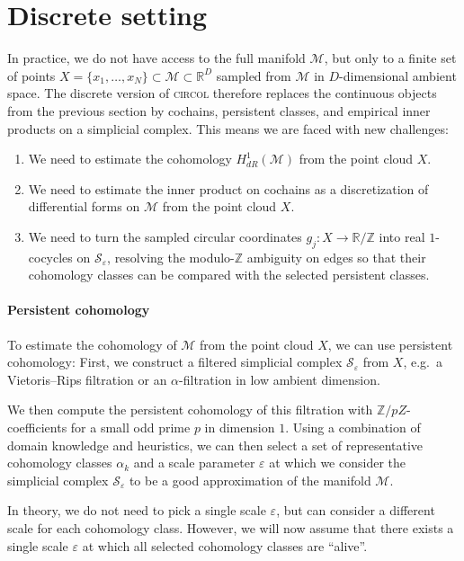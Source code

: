 \documentclass[a4paper,11pt, DIV=10]{scrartcl}
\numberwithin{equation}{section}
\theoremstyle{definition}
\theoremstyle{remark}
\newcommand{\Z}{\mathbb{Z}}
\newcommand{\R}{\mathbb{R}}
\newcommand{\mc}[1]{\mathcal{#1}}
\begin{document}
\section{Discrete setting}
\label{sec:discrete-setting}
In practice, we do not have access to the full manifold $\mc{M}$, but only to a finite set of points $X=\{x_1,\dots, x_N\}\subset \mc{M}\subset \R^D$ sampled from $\mc{M}$ in $D$-dimensional ambient space.
The discrete version of \textsc{circol} therefore replaces the continuous objects from the previous section by cochains, persistent classes, and empirical inner products on a simplicial complex.
This means we are faced with new challenges:
\begin{enumerate}
	\item We need to estimate the cohomology $H^1_{dR}(\mc{M})$ from the point cloud $X$.
	\item We need to estimate the inner product on cochains as a discretization of differential forms on $\mc{M}$ from the point cloud $X$.
	\item We need to turn the sampled circular coordinates $g_j\colon X\to \R/\Z$ into real $1$-cocycles on $\mc{S}_\varepsilon$, resolving the modulo-$\Z$ ambiguity on edges so that their cohomology classes can be compared with the selected persistent classes.
\end{enumerate}
\paragraph{Persistent cohomology}
To estimate the cohomology of $\mc{M}$ from the point cloud $X$, we can use persistent cohomology:
First, we construct a filtered simplicial complex $\mc{S}_\varepsilon$ from $X$, e.g.\ a Vietoris--Rips filtration or an $\alpha$-filtration in low ambient dimension.

We then compute the persistent cohomology of this filtration with $\Z/pZ$-coefficients for a small odd prime $p$ in dimension $1$.
Using a combination of domain knowledge and heuristics, we can then select a set of representative cohomology classes $\alpha_k$ and a scale parameter $\varepsilon$ at which we consider the simplicial complex $\mc{S}_\varepsilon$ to be a good approximation of the manifold $\mc{M}$.

In theory, we do not need to pick a single scale $\varepsilon$, but can consider a different scale for each cohomology class.
However, we will now assume that there exists a single scale $\varepsilon$ at which all selected cohomology classes are \enquote{alive}.
\end{document}
